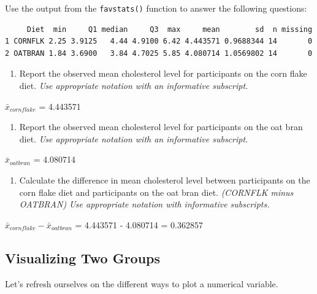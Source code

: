 \documentclass[
  letterpaper,
  DIV=11,
  numbers=noendperiod]{scrartcl}
\providecommand{\tightlist}{%
  \setlength{\itemsep}{0pt}\setlength{\parskip}{0pt}}\usepackage{longtable,booktabs,array}
\begin{document}
Use the output from the \texttt{favstats()} function to answer the
following questions:

\begin{verbatim}
     Diet  min     Q1 median     Q3  max     mean        sd  n missing
1 CORNFLK 2.25 3.9125   4.44 4.9100 6.42 4.443571 0.9688344 14       0
2 OATBRAN 1.84 3.6900   3.84 4.7025 5.85 4.080714 1.0569802 14       0
\end{verbatim}

\vspace{0.8in}

\begin{enumerate}
\def\labelenumi{\arabic{enumi}.}
\setcounter{enumi}{3}
\tightlist
\item
  Report the observed mean cholesterol level for participants on the
  corn flake diet. \emph{Use appropriate notation with an informative
  subscript.}
\end{enumerate}

\(\bar{x}_{cornflake}\) = 4.443571

\begin{enumerate}
\def\labelenumi{\arabic{enumi}.}
\setcounter{enumi}{4}
\tightlist
\item
  Report the observed mean cholesterol level for participants on the oat
  bran diet. \emph{Use appropriate notation with an informative
  subscript.}
\end{enumerate}

\(\bar{x}_{oatbran}\) = 4.080714

\begin{enumerate}
\def\labelenumi{\arabic{enumi}.}
\setcounter{enumi}{5}
\tightlist
\item
  Calculate the difference in mean cholesterol level between
  participants on the corn flake diet and participants on the oat bran
  diet. \emph{(CORNFLK minus OATBRAN) Use appropriate notation with
  informative subscripts.}
\end{enumerate}

\(\bar{x}_{cornflake} - \bar{x}_{oatbran}\) = 4.443571 - 4.080714 =
0.362857

\hypertarget{visualizing-two-groups}{%
\subsection{Visualizing Two Groups}\label{visualizing-two-groups}}

Let's refresh ourselves on the different ways to plot a numerical
variable.
\end{document}
